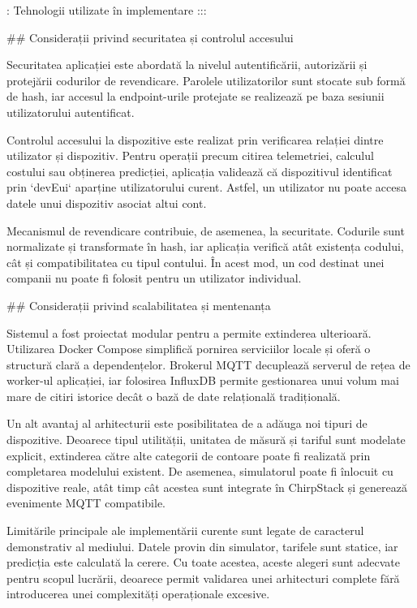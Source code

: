   : Tehnologii utilizate în implementare
:::

## Considerații privind securitatea și controlul accesului

Securitatea aplicației este abordată la nivelul autentificării,
autorizării și protejării codurilor de revendicare. Parolele
utilizatorilor sunt stocate sub formă de hash, iar accesul la
endpoint-urile protejate se realizează pe baza sesiunii utilizatorului
autentificat.

Controlul accesului la dispozitive este realizat prin verificarea
relației dintre utilizator și dispozitiv. Pentru operații precum citirea
telemetriei, calculul costului sau obținerea predicției, aplicația
validează că dispozitivul identificat prin `devEui` aparține
utilizatorului curent. Astfel, un utilizator nu poate accesa datele unui
dispozitiv asociat altui cont.

Mecanismul de revendicare contribuie, de asemenea, la securitate.
Codurile sunt normalizate și transformate în hash, iar aplicația
verifică atât existența codului, cât și compatibilitatea cu tipul
contului. În acest mod, un cod destinat unei companii nu poate fi
folosit pentru un utilizator individual.

## Considerații privind scalabilitatea și mentenanța

Sistemul a fost proiectat modular pentru a permite extinderea
ulterioară. Utilizarea Docker Compose simplifică pornirea serviciilor
locale și oferă o structură clară a dependențelor. Brokerul MQTT
decuplează serverul de rețea de worker-ul aplicației, iar folosirea
InfluxDB permite gestionarea unui volum mai mare de citiri istorice
decât o bază de date relațională tradițională.

Un alt avantaj al arhitecturii este posibilitatea de a adăuga noi tipuri
de dispozitive. Deoarece tipul utilității, unitatea de măsură și tariful
sunt modelate explicit, extinderea către alte categorii de contoare
poate fi realizată prin completarea modelului existent. De asemenea,
simulatorul poate fi înlocuit cu dispozitive reale, atât timp cât
acestea sunt integrate în ChirpStack și generează evenimente MQTT
compatibile.

Limitările principale ale implementării curente sunt legate de
caracterul demonstrativ al mediului. Datele provin din simulator,
tarifele sunt statice, iar predicția este calculată la cerere. Cu toate
acestea, aceste alegeri sunt adecvate pentru scopul lucrării, deoarece
permit validarea unei arhitecturi complete fără introducerea unei
complexități operaționale excesive.

